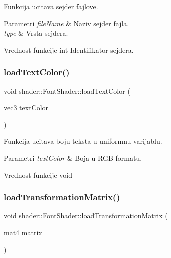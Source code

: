 Funkcija ucitava sejder fajlove. 


\begin{DoxyParams}{Parametri}
{\em file\+Name} & Naziv sejder fajla. \\
\hline
{\em type} & Vrsta sejdera. \\
\hline
\end{DoxyParams}
\begin{DoxyReturn}{Vrednost funkcije}
int Identifikator sejdera. 
\end{DoxyReturn}
\mbox{\label{classshader_1_1FontShader_a51f55279667df9c2661909a0bfbcdebe}} 
\subsubsection{\texorpdfstring{load\+Text\+Color()}{loadTextColor()}}
{\footnotesize\ttfamily void shader\+::\+Font\+Shader\+::load\+Text\+Color (\begin{DoxyParamCaption}\item[{vec3}]{text\+Color }\end{DoxyParamCaption})}



Funkcija ucitava boju teksta u uniformnu varijablu. 


\begin{DoxyParams}{Parametri}
{\em text\+Color} & Boja u R\+GB formatu. \\
\hline
\end{DoxyParams}
\begin{DoxyReturn}{Vrednost funkcije}
void 
\end{DoxyReturn}
\mbox{\label{classshader_1_1FontShader_a050d93154a3baabd8a61344670f76a9d}} 
\subsubsection{\texorpdfstring{load\+Transformation\+Matrix()}{loadTransformationMatrix()}}
{\footnotesize\ttfamily void shader\+::\+Font\+Shader\+::load\+Transformation\+Matrix (\begin{DoxyParamCaption}\item[{mat4}]{matrix }\end{DoxyParamCaption})}



